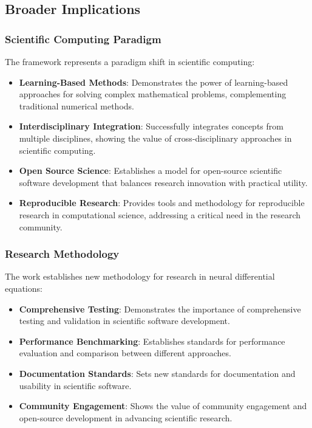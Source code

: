 \subsection{Broader Implications}

\subsubsection{Scientific Computing Paradigm}

The framework represents a paradigm shift in scientific computing:

\begin{itemize}
    \item \textbf{Learning-Based Methods}: Demonstrates the power of learning-based approaches for solving complex mathematical problems, complementing traditional numerical methods.
    
    \item \textbf{Interdisciplinary Integration}: Successfully integrates concepts from multiple disciplines, showing the value of cross-disciplinary approaches in scientific computing.
    
    \item \textbf{Open Source Science}: Establishes a model for open-source scientific software development that balances research innovation with practical utility.
    
    \item \textbf{Reproducible Research}: Provides tools and methodology for reproducible research in computational science, addressing a critical need in the research community.
\end{itemize}

\subsubsection{Research Methodology}

The work establishes new methodology for research in neural differential equations:

\begin{itemize}
    \item \textbf{Comprehensive Testing}: Demonstrates the importance of comprehensive testing and validation in scientific software development.
    
    \item \textbf{Performance Benchmarking}: Establishes standards for performance evaluation and comparison between different approaches.
    
    \item \textbf{Documentation Standards}: Sets new standards for documentation and usability in scientific software.
    
    \item \textbf{Community Engagement}: Shows the value of community engagement and open-source development in advancing scientific research.
\end{itemize}


